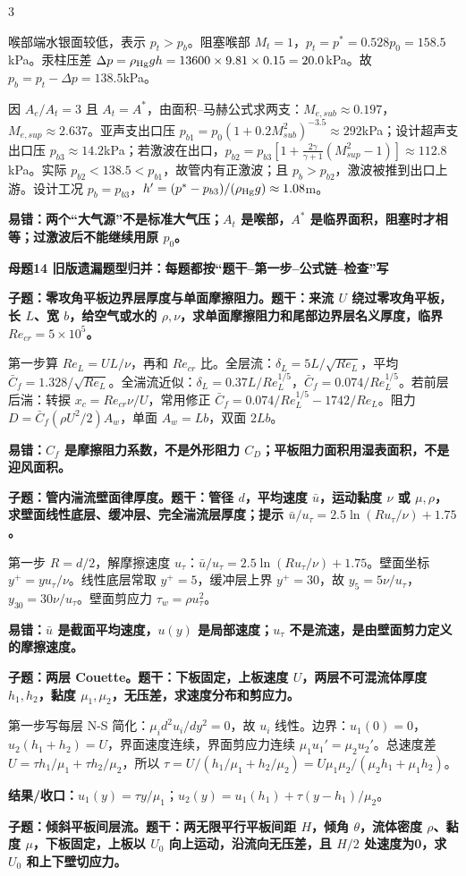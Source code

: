 \documentclass[a4paper]{article}
\newcommand{\mt}[1]{\vspace{0.45pt}\colorbox{M}{\parbox{\dimexpr\linewidth-2\fboxsep}{\color{white}\bfseries #1}}\par}
\newcommand{\qt}[1]{\vspace{0.25pt}\colorbox{Q}{\parbox{\dimexpr\linewidth-2\fboxsep}{\color{white}\bfseries #1}}\par}
\newcommand{\ans}[1]{\colorbox{G}{\parbox{\dimexpr\linewidth-2\fboxsep}{#1}}\par}
\newcommand{\warn}[1]{\colorbox{Y}{\parbox{\dimexpr\linewidth-2\fboxsep}{\color{E}\bfseries #1}}\par}
\newcommand{\res}[1]{{\color{E}\bfseries 结果/收口：}#1\par}
\begin{document}
\begin{multicols}{3}
\ans{喉部端水银面较低，表示 $p_t>p_b$。阻塞喉部 $M_t=1$，$p_t=p^*=0.528p_0=158.5$kPa。汞柱压差 $\Delta p=\rho_{\rm Hg}gh=13600\times9.81\times0.15=20.0$kPa。故 $p_b=p_t-\Delta p=138.5$kPa。}
\ans{因 $A_e/A_t=3$ 且 $A_t=A^*$，由面积--马赫公式求两支：$M_{e,sub}\approx0.197$，$M_{e,sup}\approx2.637$。亚声支出口压 $p_{b1}=p_0(1+0.2M_{sub}^2)^{-3.5}\approx292$kPa；设计超声支出口压 $p_{b3}\approx14.2$kPa；若激波在出口，$p_{b2}=p_{b3}[1+\frac{2\gamma}{\gamma+1}(M_{sup}^2-1)]\approx112.8$kPa。实际 $p_{b2}<138.5<p_{b1}$，故管内有正激波；且 $p_b>p_{b2}$，激波被推到出口上游。设计工况 $p_b=p_{b3}$，$h'=(p^*-p_{b3})/(\rho_{\rm Hg}g)\approx1.08$m。}
\warn{易错：两个“大气源”不是标准大气压；$A_t$ 是喉部，$A^*$ 是临界面积，阻塞时才相等；过激波后不能继续用原 $p_0$。}

\mt{母题14 旧版遗漏题型归并：每题都按“题干--第一步--公式链--检查”写}
\qt{子题：零攻角平板边界层厚度与单面摩擦阻力。题干：来流 $U$ 绕过零攻角平板，长 $L$、宽 $b$，给空气或水的 $\rho,\nu$，求单面摩擦阻力和尾部边界层名义厚度，临界 $Re_{cr}=5\times10^5$。}
\ans{第一步算 $Re_L=UL/\nu$，再和 $Re_{cr}$ 比。全层流：$\delta_L=5L/\sqrt{Re_L}$，平均 $\bar C_f=1.328/\sqrt{Re_L}$。全湍流近似：$\delta_L=0.37L/Re_L^{1/5}$，$\bar C_f=0.074/Re_L^{1/5}$。若前层后湍：转捩 $x_c=Re_{cr}\nu/U$，常用修正 $\bar C_f=0.074/Re_L^{1/5}-1742/Re_L$。阻力 $D=\bar C_f(\rho U^2/2)A_w$，单面 $A_w=Lb$，双面 $2Lb$。}
\warn{易错：$C_f$ 是摩擦阻力系数，不是外形阻力 $C_D$；平板阻力面积用湿表面积，不是迎风面积。}
\qt{子题：管内湍流壁面律厚度。题干：管径 $d$，平均速度 $\bar u$，运动黏度 $\nu$ 或 $\mu,\rho$，求壁面线性底层、缓冲层、完全湍流层厚度；提示 $\bar u/u_\tau=2.5\ln(Ru_\tau/\nu)+1.75$。}
\ans{第一步 $R=d/2$，解摩擦速度 $u_\tau$：$\bar u/u_\tau=2.5\ln(Ru_\tau/\nu)+1.75$。壁面坐标 $y^+=yu_\tau/\nu$。线性底层常取 $y^+=5$，缓冲层上界 $y^+=30$，故 $y_5=5\nu/u_\tau$，$y_{30}=30\nu/u_\tau$。壁面剪应力 $\tau_w=\rho u_\tau^2$。}
\warn{易错：$\bar u$ 是截面平均速度，$u(y)$ 是局部速度；$u_\tau$ 不是流速，是由壁面剪力定义的摩擦速度。}
\qt{子题：两层 Couette。题干：下板固定，上板速度 $U$，两层不可混流体厚度 $h_1,h_2$，黏度 $\mu_1,\mu_2$，无压差，求速度分布和剪应力。}
\ans{第一步写每层 N-S 简化：$\mu_i d^2u_i/dy^2=0$，故 $u_i$ 线性。边界：$u_1(0)=0$，$u_2(h_1+h_2)=U$，界面速度连续，界面剪应力连续 $\mu_1u_1'=\mu_2u_2'$。总速度差 $U=\tau h_1/\mu_1+\tau h_2/\mu_2$，所以 $\tau=U/(h_1/\mu_1+h_2/\mu_2)=U\mu_1\mu_2/(\mu_2h_1+\mu_1h_2)$。}
\res{$u_1(y)=\tau y/\mu_1$；$u_2(y)=u_1(h_1)+\tau(y-h_1)/\mu_2$。}
\qt{子题：倾斜平板间层流。题干：两无限平行平板间距 $H$，倾角 $\theta$，流体密度 $\rho$、黏度 $\mu$，下板固定，上板以 $U_0$ 向上运动，沿流向无压差，且 $H/2$ 处速度为0，求 $U_0$ 和上下壁切应力。}

\end{multicols}
\end{document}
